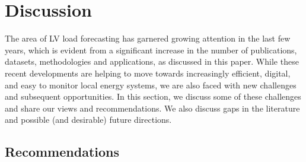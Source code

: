 \section{Discussion}
\label{sec_discussion}


The area of LV load forecasting has garnered growing attention in the last few years, which is evident from a significant increase in the number of publications, datasets, methodologies and applications, as discussed in this paper. While these recent developments are helping to move towards increasingly efficient, digital, and easy to monitor local energy systems, we are also faced with new challenges and subsequent opportunities. In this section, we discuss some of these challenges and share our views and recommendations. We also discuss gaps in the literature and possible (and desirable) future directions. 

\subsection{Recommendations}


